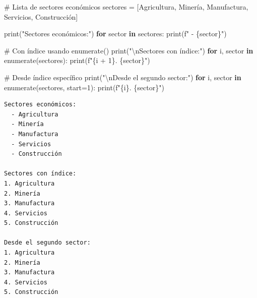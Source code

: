 \documentclass[
  doc,
  floatsintext,
  longtable,
  a4paper,
  nolmodern,
  notxfonts,
  notimes,
  12pt,
  colorlinks=true,linkcolor=blue,citecolor=blue,urlcolor=blue]{apa7}
\newenvironment{Shaded}{\begin{snugshade}}{\end{snugshade}}
\newcommand{\BuiltInTok}[1]{\textcolor[rgb]{0.00,0.23,0.31}{#1}}
\newcommand{\CharTok}[1]{\textcolor[rgb]{0.13,0.47,0.30}{#1}}
\newcommand{\CommentTok}[1]{\textcolor[rgb]{0.37,0.37,0.37}{#1}}
\newcommand{\ControlFlowTok}[1]{\textcolor[rgb]{0.00,0.23,0.31}{\textbf{#1}}}
\newcommand{\DecValTok}[1]{\textcolor[rgb]{0.68,0.00,0.00}{#1}}
\newcommand{\KeywordTok}[1]{\textcolor[rgb]{0.00,0.23,0.31}{\textbf{#1}}}
\newcommand{\NormalTok}[1]{\textcolor[rgb]{0.00,0.23,0.31}{#1}}
\newcommand{\OperatorTok}[1]{\textcolor[rgb]{0.37,0.37,0.37}{#1}}
\newcommand{\SpecialCharTok}[1]{\textcolor[rgb]{0.37,0.37,0.37}{#1}}
\newcommand{\SpecialStringTok}[1]{\textcolor[rgb]{0.13,0.47,0.30}{#1}}
\newcommand{\StringTok}[1]{\textcolor[rgb]{0.13,0.47,0.30}{#1}}
\begin{document}
\begin{Shaded}
\begin{Highlighting}[]
\CommentTok{\# Lista de sectores económicos}
\NormalTok{sectores }\OperatorTok{=}\NormalTok{ [}\StringTok{\textquotesingle{}Agricultura\textquotesingle{}}\NormalTok{, }\StringTok{\textquotesingle{}Minería\textquotesingle{}}\NormalTok{, }\StringTok{\textquotesingle{}Manufactura\textquotesingle{}}\NormalTok{, }\StringTok{\textquotesingle{}Servicios\textquotesingle{}}\NormalTok{, }\StringTok{\textquotesingle{}Construcción\textquotesingle{}}\NormalTok{]}

\BuiltInTok{print}\NormalTok{(}\StringTok{"Sectores económicos:"}\NormalTok{)}
\ControlFlowTok{for}\NormalTok{ sector }\KeywordTok{in}\NormalTok{ sectores:}
    \BuiltInTok{print}\NormalTok{(}\SpecialStringTok{f"  {-} }\SpecialCharTok{\{}\NormalTok{sector}\SpecialCharTok{\}}\SpecialStringTok{"}\NormalTok{)}

\CommentTok{\# Con índice usando enumerate()}
\BuiltInTok{print}\NormalTok{(}\StringTok{"}\CharTok{\textbackslash{}n}\StringTok{Sectores con índice:"}\NormalTok{)}
\ControlFlowTok{for}\NormalTok{ i, sector }\KeywordTok{in} \BuiltInTok{enumerate}\NormalTok{(sectores):}
    \BuiltInTok{print}\NormalTok{(}\SpecialStringTok{f"}\SpecialCharTok{\{}\NormalTok{i }\OperatorTok{+} \DecValTok{1}\SpecialCharTok{\}}\SpecialStringTok{. }\SpecialCharTok{\{}\NormalTok{sector}\SpecialCharTok{\}}\SpecialStringTok{"}\NormalTok{)}

\CommentTok{\# Desde índice específico}
\BuiltInTok{print}\NormalTok{(}\StringTok{"}\CharTok{\textbackslash{}n}\StringTok{Desde el segundo sector:"}\NormalTok{)}
\ControlFlowTok{for}\NormalTok{ i, sector }\KeywordTok{in} \BuiltInTok{enumerate}\NormalTok{(sectores, start}\OperatorTok{=}\DecValTok{1}\NormalTok{):}
    \BuiltInTok{print}\NormalTok{(}\SpecialStringTok{f"}\SpecialCharTok{\{}\NormalTok{i}\SpecialCharTok{\}}\SpecialStringTok{. }\SpecialCharTok{\{}\NormalTok{sector}\SpecialCharTok{\}}\SpecialStringTok{"}\NormalTok{)}
\end{Highlighting}
\end{Shaded}

\begin{verbatim}
Sectores económicos:
  - Agricultura
  - Minería
  - Manufactura
  - Servicios
  - Construcción

Sectores con índice:
1. Agricultura
2. Minería
3. Manufactura
4. Servicios
5. Construcción

Desde el segundo sector:
1. Agricultura
2. Minería
3. Manufactura
4. Servicios
5. Construcción
\end{verbatim}
\end{document}
